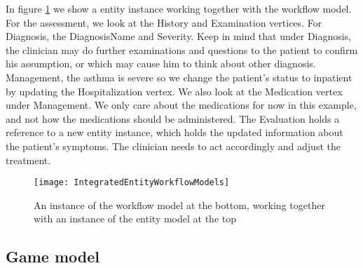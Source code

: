 In figure \ref{fig:IntegratedEntityWorkflowModels} we show a entity instance working together with the workflow model. For the assessment, we look at the History and Examination vertices. For Diagnosis, the DiagnosisName and Severity. Keep in mind that under Diagnosis, the clinician may do further examinations and questions to the patient to confirm his assumption, or which may cause him to think about other diagnosis. Management, the asthma is severe so we change the patient's status to inpatient by updating the Hospitalization vertex. We also look at the Medication vertex under Management. We only care about the medications for now in this example, and not how the medications should be administered. The Evaluation holds a reference to a new entity instance, which holds the updated information about the patient's symptoms. The clinician needs to act accordingly and adjust the treatment.
\begin{figure}[h!]
	\caption {An instance of the workflow model at the bottom, working together with an instance of the entity model at the top}
	\label{fig:IntegratedEntityWorkflowModels}
	\texttt{[image: IntegratedEntityWorkflowModels]}
\end{figure}

\subsection{Game model}
